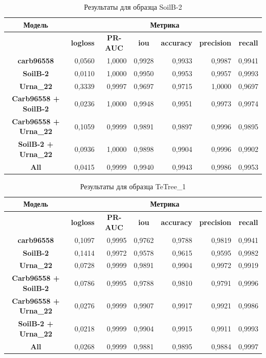 \documentclass[14pt, a4paper, oneside, bold]{extarticle}
\begin{document}
\begin{table}[htbp]
\small
\begin{tabular}{|c|r|r|r|r|r|r|}
\hline
\textbf{Модель} & \multicolumn{ 6}{c|}{\textbf{Метрика}} \\ \hline
\textbf{} & \multicolumn{1}{c|}{\textbf{logloss}} & \multicolumn{1}{c|}{\textbf{PR-AUC}} & \multicolumn{1}{c|}{\textbf{iou}} & \multicolumn{1}{c|}{\textbf{accuracy}} & \multicolumn{1}{c|}{\textbf{precision}} & \multicolumn{1}{c|}{\textbf{recall}} \\ \hline
\textbf{carb96558} & 0,0560 & 1,0000 & 0,9928 & 0,9933 & 0,9987 & 0,9941 \\ \hline
\textbf{SoilB-2} & 0,0110 & 1,0000 & 0,9950 & 0,9953 & 0,9957 & 0,9993 \\ \hline
\textbf{Urna\_22} & 0,3339 & 0,9997 & 0,9697 & 0,9715 & 1,0000 & 0,9697 \\ \hline
\textbf{Carb96558 + SoilB-2} & 0,0236 & 1,0000 & 0,9948 & 0,9951 & 0,9973 & 0,9974 \\ \hline
\textbf{Carb96558 + Urna\_22} & 0,1059 & 0,9999 & 0,9891 & 0,9897 & 0,9996 & 0,9895 \\ \hline
\textbf{SoilB-2 + Urna\_22} & 0,0936 & 1,0000 & 0,9898 & 0,9904 & 0,9996 & 0,9902 \\ \hline
\textbf{All} & 0,0415 & 0,9999 & 0,9940 & 0,9943 & 0,9986 & 0,9953 \\ \hline
\end{tabular}
\caption{Результаты для образца SoilB-2}
\label{SoilB-2}
\end{table}


\begin{table}[htbp]
\small
\begin{tabular}{|c|r|r|r|r|r|r|}
\hline
\textbf{Модель} & \multicolumn{ 6}{c|}{\textbf{Метрика}} \\ \hline
\textbf{} & \multicolumn{1}{c|}{\textbf{logloss}} & \multicolumn{1}{c|}{\textbf{PR-AUC}} & \multicolumn{1}{c|}{\textbf{iou}} & \multicolumn{1}{c|}{\textbf{accuracy}} & \multicolumn{1}{c|}{\textbf{precision}} & \multicolumn{1}{c|}{\textbf{recall}} \\ \hline
\textbf{carb96558} & 0,1097 & 0,9995 & 0,9762 & 0,9788 & 0,9819 & 0,9941 \\ \hline
\textbf{SoilB-2} & 0,1414 & 0,9972 & 0,9578 & 0,9615 & 0,9595 & 0,9982 \\ \hline
\textbf{Urna\_22} & 0,0728 & 0,9999 & 0,9891 & 0,9904 & 0,9972 & 0,9919 \\ \hline
\textbf{Carb96558 + SoilB-2} & 0,0786 & 0,9995 & 0,9788 & 0,9810 & 0,9791 & 0,9996 \\ \hline
\textbf{Carb96558 + Urna\_22} & 0,0276 & 0,9999 & 0,9907 & 0,9917 & 0,9921 & 0,9986 \\ \hline
\textbf{SoilB-2 + Urna\_22} & 0,0218 & 0,9999 & 0,9904 & 0,9915 & 0,9911 & 0,9993 \\ \hline
\textbf{All} & 0,0268 & 0,9999 & 0,9881 & 0,9895 & 0,9884 & 0,9997 \\ \hline
\end{tabular}
\caption{Результаты для образца TeTree\_1}
\label{TeTree_1}
\end{table}
\end{document}
